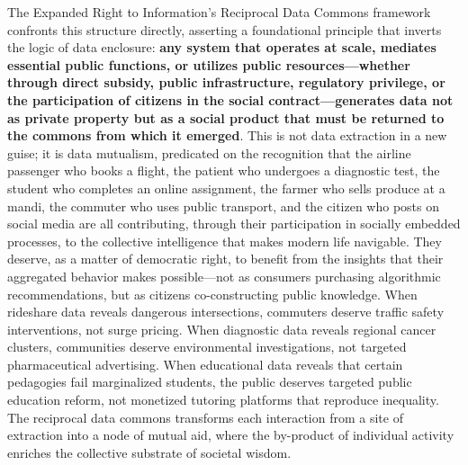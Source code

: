 The Expanded Right to Information's Reciprocal Data Commons framework
confronts this structure directly, asserting a foundational principle
that inverts the logic of data enclosure: \textbf{any system that
operates at scale, mediates essential public functions, or utilizes
public resources---whether through direct subsidy, public
infrastructure, regulatory privilege, or the participation of citizens
in the social contract---generates data not as private property but as a
social product that must be returned to the commons from which it
emerged}. This is not data extraction in a new guise; it is data
mutualism, predicated on the recognition that the airline passenger who
books a flight, the patient who undergoes a diagnostic test, the student
who completes an online assignment, the farmer who sells produce at a
mandi, the commuter who uses public transport, and the citizen who posts
on social media are all contributing, through their participation in
socially embedded processes, to the collective intelligence that makes
modern life navigable. They deserve, as a matter of democratic right, to
benefit from the insights that their aggregated behavior makes
possible---not as consumers purchasing algorithmic recommendations, but
as citizens co-constructing public knowledge. When rideshare data
reveals dangerous intersections, commuters deserve traffic safety
interventions, not surge pricing. When diagnostic data reveals regional
cancer clusters, communities deserve environmental investigations, not
targeted pharmaceutical advertising. When educational data reveals that
certain pedagogies fail marginalized students, the public deserves
targeted public education reform, not monetized tutoring platforms that
reproduce inequality. The reciprocal data commons transforms each
interaction from a site of extraction into a node of mutual aid, where
the by-product of individual activity enriches the collective substrate
of societal wisdom.

